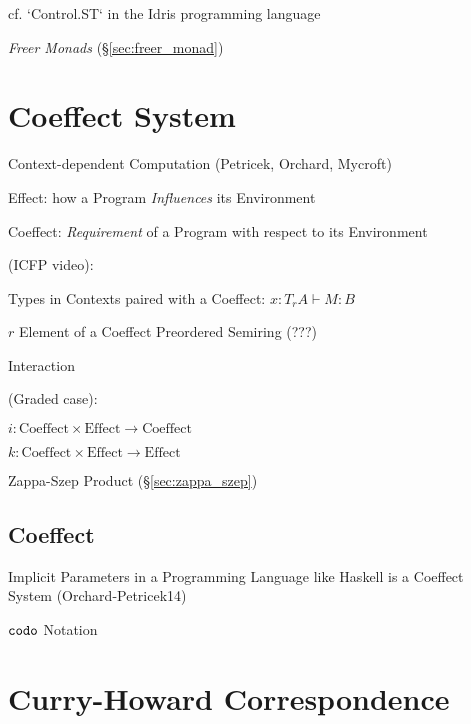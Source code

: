 cf. `Control.ST` in the Idris programming language

\emph{Freer Monads} (\S\ref{sec:freer_monad})



\section{Coeffect System}\label{sec:coeffect_system}

Context-dependent Computation (Petricek, Orchard, Mycroft)

Effect: how a Program \emph{Influences} its Environment

Coeffect: \emph{Requirement} of a Program with respect to its
Environment

(ICFP video):

Types in Contexts paired with a Coeffect:
$x : T_r A \vdash M : B$

$r$ Element of a Coeffect Preordered Semiring (???) %

Interaction

(Graded case):

$i : \text{Coeffect} \times \text{Effect} \rightarrow \text{Coeffect}$

$k : \text{Coeffect} \times \text{Effect} \rightarrow \text{Effect}$

Zappa-Szep Product (\S\ref{sec:zappa_szep})



\subsection{Coeffect}\label{sec:coeffect}

Implicit Parameters in a Programming Language like Haskell is a
Coeffect System (Orchard-Petricek14)

$\mathtt{codo}$ Notation



\section{Curry-Howard Correspondence}\label{sec:curry_howard}

